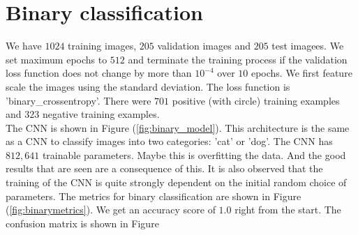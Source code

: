 \documentclass{article}
\begin{document}
\section{Binary classification}
We have $1024$ training images, $205$ validation images and $205$ test imagees. We set maximum epochs to $512$ and terminate the training process if the validation loss function does not change by more than $10^{-4}$ over $10$ epochs. We first feature scale the images using the standard deviation. The loss function is 'binary\_crossentropy'. There were $701$ positive (with circle) training examples and $323$ negative training examples. \\ The CNN is shown in Figure (\ref{fig:binary_model}). This architecture is the same as a CNN to classify images into two categories: 'cat' or 'dog'. The CNN has $812,641$ trainable parameters. Maybe this is overfitting the data. And the good results that are seen are a consequence of this. It is also observed that the training of the CNN is quite strongly dependent on the initial random choice of parameters. The metrics for binary classification are shown in Figure (\ref{fig:binarymetrics}). We get an accuracy score of $1.0$ right from the start. The confusion matrix is shown in Figure 
\end{document}
